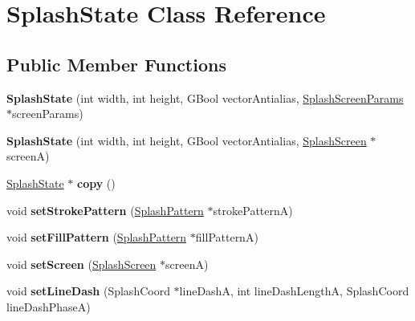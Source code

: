 \hypertarget{class_splash_state}{}\section{Splash\+State Class Reference}
\label{class_splash_state}
\subsection*{Public Member Functions}
\begin{DoxyCompactItemize}
\item 
\mbox{\label{class_splash_state_a5038aa06557856e5eb36f40ff07e3f54}} 
{\bfseries Splash\+State} (int width, int height, G\+Bool vector\+Antialias, \hyperlink{struct_splash_screen_params}{Splash\+Screen\+Params} $\ast$screen\+Params)
\item 
\mbox{\label{class_splash_state_ab25cd43901084c1cc3ffc9d6faebab4a}} 
{\bfseries Splash\+State} (int width, int height, G\+Bool vector\+Antialias, \hyperlink{class_splash_screen}{Splash\+Screen} $\ast$screenA)
\item 
\mbox{\label{class_splash_state_a2bf50531c9617ab863d24f58fa3ef111}} 
\hyperlink{class_splash_state}{Splash\+State} $\ast$ {\bfseries copy} ()
\item 
\mbox{\label{class_splash_state_aaf6f5bfa05c432c6f4ab6f6ebaf2d3bd}} 
void {\bfseries set\+Stroke\+Pattern} (\hyperlink{class_splash_pattern}{Splash\+Pattern} $\ast$stroke\+PatternA)
\item 
\mbox{\label{class_splash_state_a0687cc8c4f90590f9fbc11f28cac4b7f}} 
void {\bfseries set\+Fill\+Pattern} (\hyperlink{class_splash_pattern}{Splash\+Pattern} $\ast$fill\+PatternA)
\item 
\mbox{\label{class_splash_state_a6651dd24cc715385b8fd99d657365964}} 
void {\bfseries set\+Screen} (\hyperlink{class_splash_screen}{Splash\+Screen} $\ast$screenA)
\item 
\mbox{\label{class_splash_state_ac64f5637a85629f0acb6d2bb0b8d911e}} 
void {\bfseries set\+Line\+Dash} (Splash\+Coord $\ast$line\+DashA, int line\+Dash\+LengthA, Splash\+Coord line\+Dash\+PhaseA)

\end{DoxyCompactItemize}
